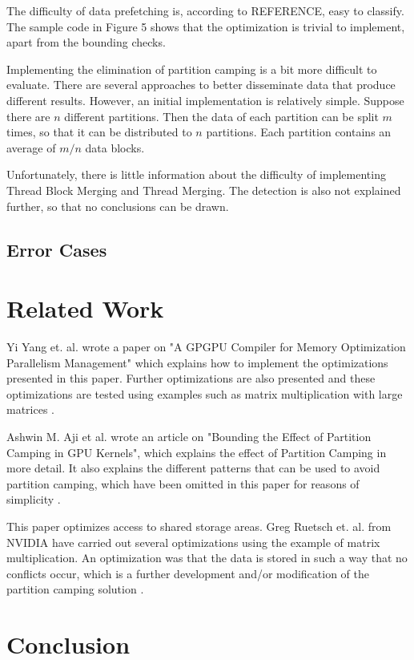 \documentclass[conference]{IEEEtran}
\begin{document}
		The difficulty of data prefetching is, according to REFERENCE, easy to classify. The sample code in Figure 5 shows that the optimization is trivial to implement, apart from the bounding checks.
		
		Implementing the elimination of partition camping is a bit more difficult to evaluate. There are several approaches to better disseminate data that produce different results. However, an initial implementation is relatively simple. 
		Suppose there are $n$ different partitions. Then the data of each partition can be split $m$ times, so that it can be distributed to $n$ partitions. Each partition contains an average of $m/n$ data blocks.
		
		
		Unfortunately, there is little information about the difficulty of implementing Thread Block Merging and Thread Merging. The detection is also not explained further, so that no conclusions can be drawn.
		
	
	\subsection{Error Cases}
	
	
\section{Related Work}

	Yi Yang et. al. wrote a paper on "A GPGPU Compiler for Memory Optimization Parallelism Management" which explains how to implement the optimizations presented in this paper. Further optimizations are also presented and these optimizations are tested using examples such as matrix multiplication with large matrices \cite{GPGPUCompiler}.
	
	Ashwin M. Aji et al. wrote an article on "Bounding the Effect of Partition Camping in GPU Kernels", which explains the effect of Partition Camping in more detail. It also explains the different patterns that can be used to avoid partition camping, which have been omitted in this paper for reasons of simplicity \cite{pc}.  
	
	This paper optimizes access to shared storage areas.  Greg Ruetsch et. al. from NVIDIA have carried out several optimizations using the example of matrix multiplication. An optimization was that the data is stored in such a way that no conflicts occur, which is a further development and/or modification of the partition camping solution \cite{mtransnvidia}.
	
\section{Conclusion}
	
\end{document}
